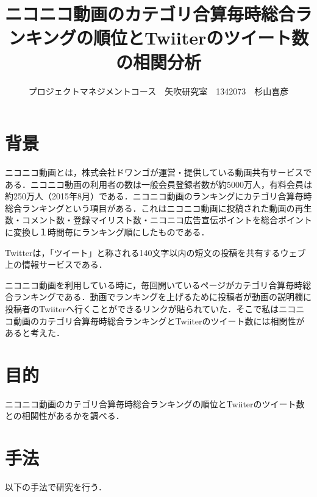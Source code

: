 \documentclass[uplatex,twocolumn,dvipdfmx]{jsarticle}
\title{\vspace{-5mm}\fontsize{14pt}{0pt}\selectfont ニコニコ動画のカテゴリ合算毎時総合ランキングの順位とTwiiterのツイート数の相関分析}
\author{\normalsize プロジェクトマネジメントコース　矢吹研究室　1342073　杉山喜彦}
\date{}
\begin{document}
\fontsize{10.5pt}{\baselineskip}\selectfont
\maketitle





\section{背景}


ニコニコ動画とは，株式会社ドワンゴが運営・提供している動画共有サービスである．ニコニコ動画の利用者の数は一般会員登録者数が約5000万人，有料会員は約250万人（2015年8月）である\cite{iii}．ニコニコ動画のランキングにカテゴリ合算毎時総合ランキングという項目がある．これはニコニコ動画に投稿された動画の再生数・コメント数・登録マイリスト数・ニコニコ広告宣伝ポイントを総合ポイントに変換し１時間毎にランキング順にしたものである．

Twitterは，「ツイート」と称される140文字以内の短文の投稿を共有するウェブ上の情報サービスである．

ニコニコ動画を利用している時に，毎回開いているページがカテゴリ合算毎時総合ランキングである．動画でランキングを上げるために投稿者が動画の説明欄に投稿者のTwiiterへ行くことができるリンクが貼られていた．そこで私はニコニコ動画のカテゴリ合算毎時総合ランキングとTwiiterのツイート数には相関性があると考えた．


\noindent



\section{目的}
ニコニコ動画のカテゴリ合算毎時総合ランキングの順位とTwiiterのツイート数との相関性があるかを調べる．

\section{手法}

以下の手法で研究を行う．
\end{document}
